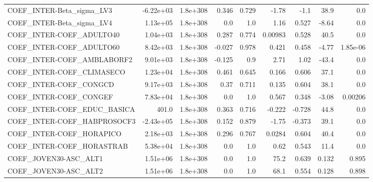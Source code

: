 \begin{tabular}{lrrrrrrrr}
COEF\_INTER-Beta\_sigma\_LV3         &   -6.22e+03 &     1.8e+308 &    0.346 &    0.729 &      -1.78 &        -1.1 &         38.9 &           0.0 \\
COEF\_INTER-Beta\_sigma\_LV4         &    1.13e+05 &     1.8e+308 &      0.0 &      1.0 &       1.16 &       0.527 &        -8.64 &           0.0 \\
COEF\_INTER-COEF\_ADULTO40          &    1.04e+03 &     1.8e+308 &    0.287 &    0.774 &    0.00983 &       0.528 &         40.5 &           0.0 \\
COEF\_INTER-COEF\_ADULTO60          &    8.42e+03 &     1.8e+308 &   -0.027 &    0.978 &      0.421 &       0.458 &        -4.77 &      1.85e-06 \\
COEF\_INTER-COEF\_AMBLABORF2        &    9.01e+03 &     1.8e+308 &   -0.125 &      0.9 &       2.71 &        1.02 &        -43.4 &           0.0 \\
COEF\_INTER-COEF\_CLIMASECO         &    1.23e+04 &     1.8e+308 &    0.461 &    0.645 &      0.166 &       0.606 &         37.1 &           0.0 \\
COEF\_INTER-COEF\_CONGCD            &    9.17e+03 &     1.8e+308 &     0.37 &    0.711 &      0.135 &       0.604 &         38.1 &           0.0 \\
COEF\_INTER-COEF\_CONGEF            &    7.83e+04 &     1.8e+308 &      0.0 &      1.0 &      0.567 &       0.348 &        -3.08 &       0.00206 \\
COEF\_INTER-COEF\_EDUC\_BASICA       &       401.0 &     1.8e+308 &    0.363 &    0.716 &     -0.222 &      -0.728 &         44.8 &           0.0 \\
COEF\_INTER-COEF\_HABPROSOCF3       &   -2.43e+05 &     1.8e+308 &    0.152 &    0.879 &      -1.75 &      -0.373 &         39.1 &           0.0 \\
COEF\_INTER-COEF\_HORAPICO          &    2.18e+03 &     1.8e+308 &    0.296 &    0.767 &     0.0284 &       0.604 &         40.4 &           0.0 \\
COEF\_INTER-COEF\_HORASTRAB         &    5.38e+04 &     1.8e+308 &      0.0 &      1.0 &       0.62 &       0.543 &         11.4 &           0.0 \\
COEF\_JOVEN30-ASC\_ALT1             &    1.51e+06 &     1.8e+308 &      0.0 &      1.0 &       75.2 &       0.639 &        0.132 &         0.895 \\
COEF\_JOVEN30-ASC\_ALT2             &    1.51e+06 &     1.8e+308 &      0.0 &      1.0 &       68.1 &       0.554 &        0.128 &         0.898 \\

\end{tabular}
